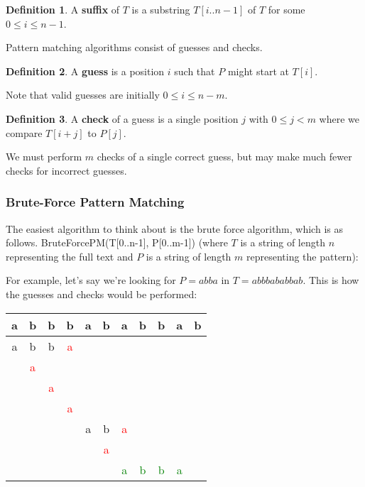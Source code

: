 \documentclass[]{article}
\theoremstyle{definition}
\newtheorem*{defn}{Definition}
\begin{document}
			\begin{defn}
				A \textbf{suffix} of $T$ is a substring $T[i..n-1]$ of $T$ for some $0 \le i \le n - 1$.
			\end{defn}

			Pattern matching algorithms consist of guesses and checks.
			\begin{defn}
				A \textbf{guess} is a position $i$ such that $P$ might start at $T[i]$.
			\end{defn}

			Note that valid guesses are initially $0 \le i \le n - m$.

			\begin{defn}
				A \textbf{check} of a guess is a single position $j$ with $0 \le j < m$ where we compare $T[i + j]$ to $P[j]$.
			\end{defn}

			We must perform $m$ checks of a single correct guess, but may make much fewer checks for incorrect guesses.
			
			\subsubsection{Brute-Force Pattern Matching}
				The easiest algorithm to think about is the brute force algorithm, which is as follows. BruteForcePM(T[0..n-1], P[0..m-1]) (where $T$ is a string of length $n$ representing the full text and $P$ is a string of length $m$ representing the pattern): \\
				\begin{algorithm}[H]
				\end{algorithm}

				For example, let's say we're looking for $P = abba$ in $T = abbbababbab$. This is how the guesses and checks would be performed:
				\begin{center}
					\begin{tabular}{|c|c|c|c|c|c|c|c|c|c|c|}
						\hline
						\textbf{a} & \textbf{b} & \textbf{b} & \textbf{b} & \textbf{a} & \textbf{b} & \textbf{a} & \textbf{b} & \textbf{b} & \textbf{a} & \textbf{b} \\ \hline
						a & b & b & \textcolor{red}{a} & & & & & & & \\
						& \textcolor{red}{a} & & & & & & & & & \\
						& & \textcolor{red}{a} & & & & & & & & \\
						& & & \textcolor{red}{a} & & & & & & & \\
						& & & & a & b & \textcolor{red}{a} & & & & \\
						& & & & & \textcolor{red}{a} & & & & & \\
						& & & & & & \textcolor{green}{a} & \textcolor{green}{b} & \textcolor{green}{b} & \textcolor{green}{a} & \\
						\hline
					\end{tabular}
				\end{center}
\end{document}
